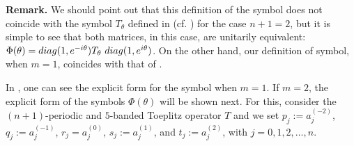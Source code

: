 \documentclass[12pt,reqno]{amsart}
\theoremstyle{definition}
\begin{document}
{\bf Remark.} We should point out that this definition of the symbol does not coincide with the symbol $T_\theta$ defined in \cite{Bebianoetal} (cf. \cite{BS}) for the case $n+1=2$, but it is simple to see that both matrices, in this case, are unitarily equivalent: $\Phi(\theta)={\rm diag}(1, e^{-i \theta}) T_{\theta} \ {\rm diag}(1, e^{i \theta})$. On the other hand, our definition of symbol, when $m=1$, coincides with that of \cite{IM}.

\vskip0.2cm

In \cite{IM}, one can see the explicit form for the symbol when $m=1$. If $m=2$, the explicit form of the symbols $\Phi(\theta)$ will be shown next. For this, consider the $(n+1)$-periodic and $5$-banded Toeplitz operator $T$ and we set $p_j:=a_j^{(-2)}$, $q_j:=a_j^{(-1)}$, $r_j=a_j^{(0)}$, $s_j:=a_j^{(1)}$, and $t_j:=a_j^{(2)}$, with $j=0,1, 2, \ldots, n$. 
    
\end{document}
